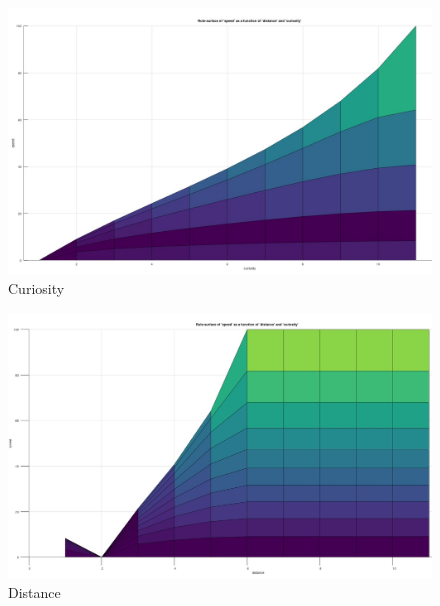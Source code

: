 \pagebreak

\begin{figure}[!h]
	\centering
	\includegraphics[width=1\textwidth]{images/curiosity}
	\caption{Curiosity}
	\label{fig:curiosity}
\end{figure}

\begin{figure}[!h]
	\centering
	\includegraphics[width=1\textwidth]{images/distance}
	\caption{Distance}
	\label{fig:distance}
\end{figure}
